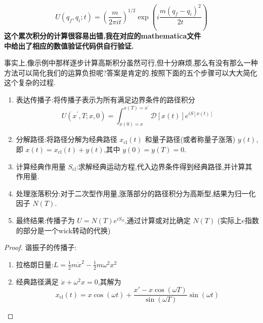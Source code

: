 \begin{kaobox}[frametitle=题目:空间内存在一个有质量的一维自由粒子]
    \begin{equation}
        U(q_f,q_i;t)=\left(\frac{m}{2\pi it}\right)^{1/2}\exp\left(i\frac{m(q_f-q_i)^2}{2t}\right)
    \end{equation}
    \textbf{这个累次积分的计算很容易出错,我在对应的mathematica文件\\中给出了相应的数值验证代码供自行验证.}
    
\end{kaobox}

\begin{remark}
    事实上,像示例中那样逐步计算高斯积分虽然可行,但十分麻烦,那么有没有那么一种方法可以简化我们的运算负担呢?答案是肯定的.按照下面的五个步骤可以大大简化这个复杂的过程.
    \begin{enumerate}
        \item 表达传播子:将传播子表示为所有满足边界条件的路径积分
        \begin{equation}
            U(x^{\prime},T;x,0)=\int_{x(0)=x}^{x(T)=x^{\prime}}\mathcal{D}[x(t)]e^{iS[x(t)]}
        \end{equation}
        \item 分解路径:将路径分解为经典路径 $x_{\text{cl}}(t)$ 和量子路径(或者称量子涨落) $y(t)$,即 $x(t) = x_{\text{cl}}(t) + y(t)$,其中 $y(0) = y(T) = 0$.
        \item 计算经典作用量 $S_{\text{cl}}$:求解经典运动方程,代入边界条件得到经典路径,并计算其作用量.\\
        \item 处理涨落积分:对于二次型作用量,涨落部分的路径积分为高斯型,结果为归一化因子 $N(T)$.
        \item 最终结果:传播子为 $U = N(T) e^{i S_{\text{cl}}}$,通过计算或对比确定 $N(T)$ (实际上$ e $指数的部分是一个wick转动的代换)
    \end{enumerate}
    \begin{proof}
        谐振子的传播子:
        \begin{enumerate}
            \item 拉格朗日量:$L = \frac{1}{2}m\dot{x}^2 - \frac{1}{2}m\omega^2 x^2$
            \item 经典路径满足 $\ddot{x} + \omega^2 x = 0$,其解为
            \begin{equation}
                x_{\text{cl}}(t) = x \cos(\omega t) + \frac{x' - x\cos(\omega T)}{\sin(\omega T)} \sin(\omega t)

\end{equation}
\end{enumerate}
\end{proof}
\end{remark}
